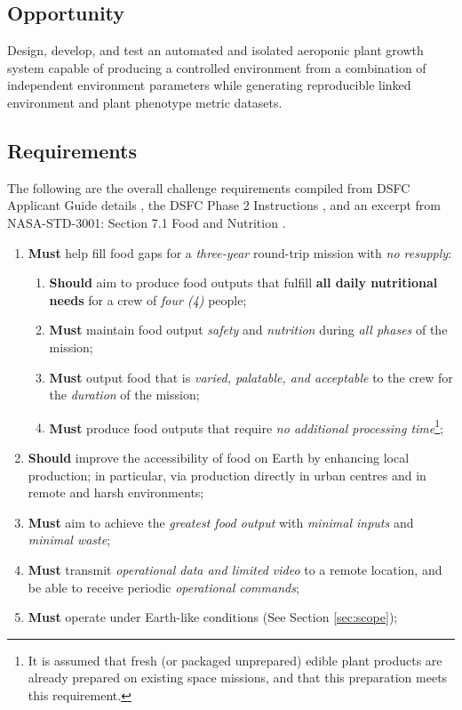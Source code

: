 \documentclass{../tex/report}
\begin{document}
\subsection{Opportunity}
\label{sec:opportunity}

Design, develop, and test an automated and isolated aeroponic plant growth system capable of producing a controlled environment from a combination of independent environment parameters while generating reproducible linked environment and plant phenotype metric datasets.

\subsection{Requirements}
\label{sec:requirements}

The following are the overall challenge requirements compiled from DSFC Applicant Guide details \cite{applicantguide}, the DSFC Phase 2 Instructions \cite{dsfc-phase2}, and an excerpt from NASA-STD-3001: Section 7.1 Food and Nutrition \cite{nutrition}.

\begin{enumerate}[label=R\arabic*., ref=R\arabic*]
    \item \label{r:1} \textbf{Must} help fill food gaps for a \textit{three-year} round-trip mission with \textit{no resupply}:
    \begin{enumerate}[ref=R1\alph*]
        \item \label{r:1a} \textbf{Should} aim to produce food outputs that fulfill \textbf{all daily nutritional needs} for a crew of \textit{four (4)} people;
        \item \label{r:1b} \textbf{Must} maintain food output \textit{safety} and \textit{nutrition} during \textit{all phases} of the mission;
        \item \label{r:1c} \textbf{Must} output food that is \textit{varied, palatable, and acceptable} to the crew for the \textit{duration} of the mission;
        \item \label{r:1d} \textbf{Must} produce food outputs that require \textit{no additional processing time}\footnote{It is assumed that fresh (or packaged unprepared) edible plant products are already prepared on existing space missions, and that this preparation meets this requirement.};
    \end{enumerate}
    \item \label{r:2} \textbf{Should} improve the accessibility of food on Earth by enhancing local production; in particular, via production directly in urban centres and in remote and harsh environments;
    \item \label{r:3} \textbf{Must} aim to achieve the \textit{greatest food output} with \textit{minimal inputs} and \textit{minimal waste};
    \item \label{r:4} \textbf{Must} transmit \textit{operational data and limited video} to a remote location, and be able to receive periodic \textit{operational commands};
    \item \label{r:5} \textbf{Must} operate under Earth-like conditions (See Section \ref{sec:scope});
\end{enumerate}
\end{document}
